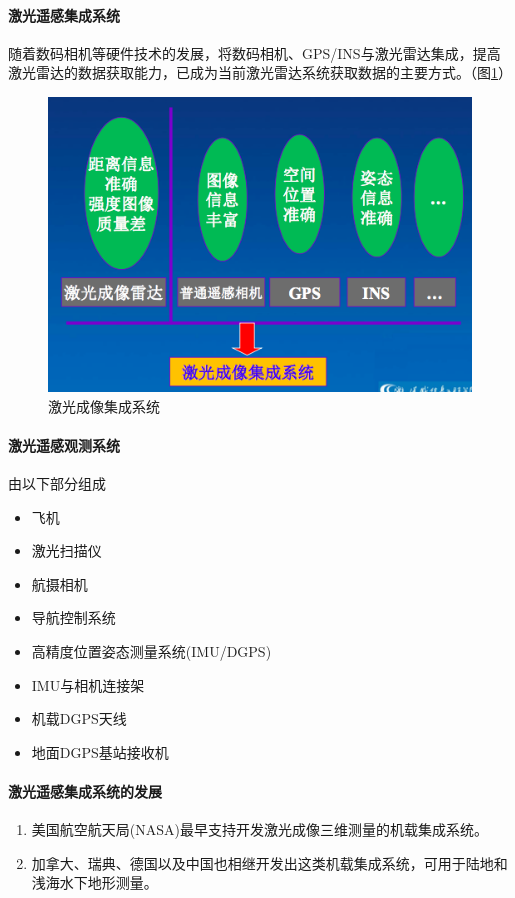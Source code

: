 \paragraph{激光遥感集成系统}随着数码相机等硬件技术的发展，将数码相机、GPS/INS与激光雷达集成，提高激光雷达的数据获取能力，已成为当前激光雷达系统获取数据的主要方式。（图\ref{fig:激光遥感集成系统}）
\begin{figure}[htbp]
	\centering
	\includegraphics[width=0.7\linewidth]{figure/Chapter1/激光遥感集成系统}
	\caption{激光成像集成系统}
	\label{fig:激光遥感集成系统}
\end{figure}
\paragraph{激光遥感观测系统}由以下部分组成
\begin{itemize}
	\item 飞机
	\item 激光扫描仪
	\item 航摄相机
	\item 导航控制系统
	\item 高精度位置姿态测量系统(IMU/DGPS)
	\item IMU与相机连接架
	\item 机载DGPS天线
	\item 地面DGPS基站接收机
\end{itemize}
\paragraph{激光遥感集成系统的发展}\begin{enumerate}
	\item 美国航空航天局(NASA)最早支持开发激光成像三维测量的机载集成系统。
	\item 加拿大、瑞典、德国以及中国也相继开发出这类机载集成系统，可用于陆地和浅海水下地形测量。
\end{enumerate}
